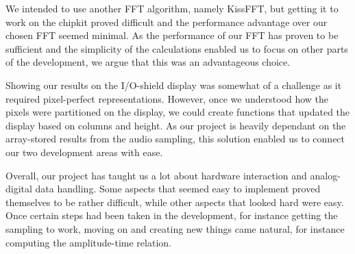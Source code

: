 \documentclass[a4paper,11pt]{article}
\begin{document}
We intended to use another FFT algorithm, namely KissFFT, but getting it to work on the chipkit proved difficult and the performance advantage over our chosen FFT seemed minimal. As the performance of our FFT has proven to be sufficient and the simplicity of the calculations enabled us to focus on other parts of the development, we argue that this was an advantageous choice.

Showing our results on the I/O-shield display was somewhat of a challenge as it required pixel-perfect representations. However, once we understood how the pixels were partitioned on the display, we could create functions that updated the display based on columns and height. As our project is heavily dependant on the array-stored results from the audio sampling, this solution enabled us to connect our two development areas with ease.

Overall, our project has taught us a lot about hardware interaction and analog-digital data handling. Some aspects that seemed easy to implement proved themselves to be rather difficult, while other aspects that looked hard were easy. Once certain steps had been taken in the development, for instance getting the sampling to work, moving on and creating new things came natural, for instance computing the amplitude-time relation.
\end{document}
